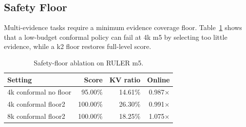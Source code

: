 \documentclass{article}
\begin{document}
\begin{table}[t]
\centering
\caption{RoPE-aware repacking ablation. Naive gathering fails at the same KV ratio; RoPE repacking recovers full-cache behavior.}
\label{tab:rope-ablation}
\end{table}

\subsection{Safety Floor}

Multi-evidence tasks require a minimum evidence coverage floor.
Table~\ref{tab:floor-ablation} shows that a low-budget conformal policy can fail at 4k m5 by selecting too little evidence, while a k2 floor restores full-level score.

\begin{table}[t]
\centering
\caption{Safety-floor ablation on RULER m5.}
\label{tab:floor-ablation}
\begin{tabular}{lrrr}
\toprule
Setting & Score & KV ratio & Online \\
\midrule
4k conformal no floor & 95.00\% & 14.61\% & 0.987$\times$ \\
4k conformal floor2 & 100.00\% & 26.30\% & 0.991$\times$ \\
8k conformal floor2 & 100.00\% & 18.25\% & 1.075$\times$ \\
\bottomrule
\end{tabular}
\end{table}
\end{document}
